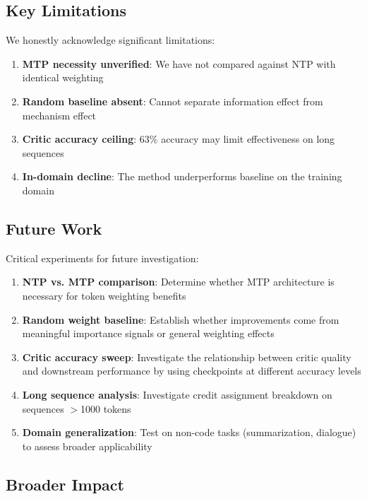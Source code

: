 \subsection{Key Limitations}

We honestly acknowledge significant limitations:

\begin{enumerate}[nosep]
    \item \textbf{MTP necessity unverified}: We have not compared against NTP with identical weighting
    \item \textbf{Random baseline absent}: Cannot separate information effect from mechanism effect
    \item \textbf{Critic accuracy ceiling}: 63\% accuracy may limit effectiveness on long sequences
    \item \textbf{In-domain decline}: The method underperforms baseline on the training domain
\end{enumerate}

\subsection{Future Work}

Critical experiments for future investigation:

\begin{enumerate}
    \item \textbf{NTP vs. MTP comparison}: Determine whether MTP architecture is necessary for token weighting benefits

    \item \textbf{Random weight baseline}: Establish whether improvements come from meaningful importance signals or general weighting effects

    \item \textbf{Critic accuracy sweep}: Investigate the relationship between critic quality and downstream performance by using checkpoints at different accuracy levels

    \item \textbf{Long sequence analysis}: Investigate credit assignment breakdown on sequences $>$1000 tokens

    \item \textbf{Domain generalization}: Test on non-code tasks (summarization, dialogue) to assess broader applicability
\end{enumerate}

\subsection{Broader Impact}


